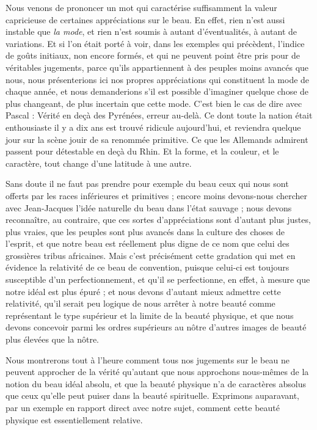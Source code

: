 \documentclass[a4paper, 11pt, oneside]{article}
\begin{document}
Nous venons de prononcer un mot qui caractérise suffisamment la valeur capricieuse de certaines appréciations sur le beau. En effet, rien n'est aussi instable que \emph{la mode}, et rien n'est soumis à autant d'éventualités, à autant de variations. Et si l'on était porté à voir, dans les exemples qui précèdent, l'indice de goûts initiaux, non encore formés, et qui ne peuvent point être pris pour de véritables jugements, parce qu'ils appartiennent à des peuples moins avancés que nous, nous présenterions ici nos propres appréciations qui constituent la mode de chaque année, et nous demanderions s'il est possible d'imaginer quelque chose de plus changeant, de plus incertain que cette mode. C'est bien le cas de dire avec Pascal : Vérité en deçà des Pyrénées, erreur au-delà. Ce dont toute la nation était enthousiaste il y a dix ans est trouvé ridicule aujourd'hui, et reviendra quelque jour sur la scène jouir de sa renommée primitive. Ce que les Allemands admirent passent pour détestable en deçà du Rhin. Et la forme, et la couleur, et le caractère, tout change d'une latitude à une autre.

Sans doute il ne faut pas prendre pour exemple du beau ceux qui nous sont offerts par les races inférieures et primitives ; encore moins devons-nous chercher avec Jean-Jacques l'idée naturelle du beau dans l'état sauvage ; nous devons reconnaître, au contraire, que ces sortes d'appréciations sont d'autant plus justes, plus vraies, que les peuples sont plus avancés dans la culture des choses de l'esprit, et que notre beau est réellement plus digne de ce nom que celui des grossières tribus africaines. Mais c'est précisément cette gradation qui met en évidence la relativité de ce beau de convention, puisque celui-ci est toujours susceptible d'un perfectionnement, et qu'il se perfectionne, en effet, à mesure que notre idéal est plus épuré ; et nous devons d'autant mieux admettre cette relativité, qu'il serait peu logique de nous arrêter à notre beauté comme représentant le type supérieur et la limite de la beauté physique, et que nous devons concevoir parmi les ordres supérieurs au nôtre d'autres images de beauté plus élevées que la nôtre.

Nous montrerons tout à l'heure comment tous nos jugements sur le beau ne peuvent approcher de la vérité qu'autant que nous approchons nous-mêmes de la notion du beau idéal absolu, et que la beauté physique n'a de caractères absolus que ceux qu'elle peut puiser dans la beauté spirituelle. Exprimons auparavant, par un exemple en rapport direct avec notre sujet, comment cette beauté physique est essentiellement relative.
\end{document}
